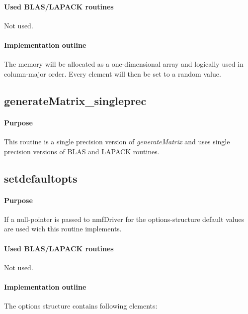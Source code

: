 \documentclass[a4paper,10pt]{scrartcl}
\begin{document}
			\paragraph{Used BLAS/LAPACK routines}

			Not used.

			\paragraph{Implementation outline}

			The memory will be allocated as a one-dimensional array and logically used in column-major 
			order. Every element will then be set to a random value.
			
		\subsection{generateMatrix\_singleprec}

			\paragraph{Purpose}

			This routine is a single precision version of \emph{generateMatrix} and uses single precision versions
			of BLAS and LAPACK routines.


		\subsection{setdefaultopts}

			\paragraph{Purpose}

			If a null-pointer is passed to nmfDriver for the options-structure default values are used
 			wich this routine implements.

			\paragraph{Used BLAS/LAPACK routines}

			Not used.

			\paragraph{Implementation outline}

			The options structure contains following elements:\newline
\end{document}
